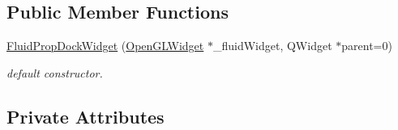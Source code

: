 \subsection*{Public Member Functions}
\begin{DoxyCompactItemize}
\item 
\hyperlink{class_fluid_prop_dock_widget_a48fd1ee2a02d9ca27f905d556ce23075}{Fluid\-Prop\-Dock\-Widget} (\hyperlink{class_open_g_l_widget}{Open\-G\-L\-Widget} $\ast$\-\_\-fluid\-Widget, Q\-Widget $\ast$parent=0)
\begin{DoxyCompactList}\small\item\em default constructor. \end{DoxyCompactList}\end{DoxyCompactItemize}
\subsection*{Private Attributes}
